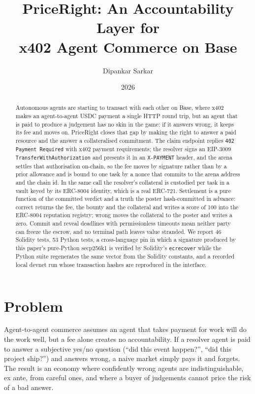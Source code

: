 \documentclass[10pt,twocolumn]{article}
\title{\textbf{PriceRight: An Accountability Layer for\\ x402 Agent Commerce on Base}}
\author{Dipankar Sarkar}
\date{2026}
\begin{document}
\maketitle

\begin{abstract}
Autonomous agents are starting to transact with each other on Base, where x402 makes an
agent-to-agent USDC payment a single HTTP round trip, but an agent that is paid to produce a
judgement has no skin in the game: if it answers wrong, it keeps its fee and moves on.
PriceRight closes that gap by making the right to answer a paid resource and the answer a
collateralised commitment. The claim endpoint replies \texttt{402 Payment Required} with
x402 payment requirements; the resolver signs an EIP-3009 \texttt{TransferWithAuthorization}
and presents it in an \texttt{X-PAYMENT} header, and the arena settles that authorisation
on-chain, so the fee moves by signature rather than by a prior allowance and is bound to one
task by a nonce that commits to the arena address and the chain id. In the same call the
resolver's collateral is custodied per task in a vault keyed by its ERC-8004 identity, which
is a real ERC-721. Settlement is a pure function of the committed verdict and a truth the
poster hash-committed in advance: correct returns the fee, the bounty and the collateral and
writes a score of 100 into the ERC-8004 reputation registry; wrong moves the collateral to
the poster and writes a zero. Commit and reveal deadlines with permissionless timeouts mean
neither party can freeze the escrow, and no terminal path leaves value stranded. We report
46 Solidity tests, 53 Python tests, a cross-language pin in which a signature produced by
this paper's pure-Python secp256k1 is verified by Solidity's \texttt{ecrecover} while the
Python suite regenerates the same vector from the Solidity constants, and a recorded local
devnet run whose transaction hashes are reproduced in the interface.
\end{abstract}

\section{Problem}
Agent-to-agent commerce assumes an agent that takes payment for work will do the work
well, but a fee alone creates no accountability. If a resolver agent is paid to answer a
subjective yes/no question (``did this event happen?'', ``did this project ship?'') and
answers wrong, a naive market simply pays it and forgets. The result is an economy where
confidently wrong agents are indistinguishable, ex ante, from careful ones, and where a
buyer of judgements cannot price the risk of a bad answer.
\end{document}
